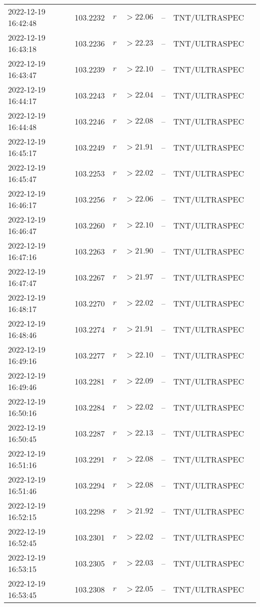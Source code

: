 \documentclass{nature_plusfigure}
\begin{document}
\begin{supplement}
\begin{center}
\begin{longtable}{lllllll}
2022-12-19 16:42:48 & 103.2232 & $r$ & $>22.06$ & -- & TNT/ULTRASPEC &  \\ 
2022-12-19 16:43:18 & 103.2236 & $r$ & $>22.23$ & -- & TNT/ULTRASPEC &  \\ 
2022-12-19 16:43:47 & 103.2239 & $r$ & $>22.10$ & -- & TNT/ULTRASPEC &  \\ 
2022-12-19 16:44:17 & 103.2243 & $r$ & $>22.04$ & -- & TNT/ULTRASPEC &  \\ 
2022-12-19 16:44:48 & 103.2246 & $r$ & $>22.08$ & -- & TNT/ULTRASPEC &  \\ 
2022-12-19 16:45:17 & 103.2249 & $r$ & $>21.91$ & -- & TNT/ULTRASPEC &  \\ 
2022-12-19 16:45:47 & 103.2253 & $r$ & $>22.02$ & -- & TNT/ULTRASPEC &  \\ 
2022-12-19 16:46:17 & 103.2256 & $r$ & $>22.06$ & -- & TNT/ULTRASPEC &  \\ 
2022-12-19 16:46:47 & 103.2260 & $r$ & $>22.10$ & -- & TNT/ULTRASPEC &  \\ 
2022-12-19 16:47:16 & 103.2263 & $r$ & $>21.90$ & -- & TNT/ULTRASPEC &  \\ 
2022-12-19 16:47:47 & 103.2267 & $r$ & $>21.97$ & -- & TNT/ULTRASPEC &  \\ 
2022-12-19 16:48:17 & 103.2270 & $r$ & $>22.02$ & -- & TNT/ULTRASPEC &  \\ 
2022-12-19 16:48:46 & 103.2274 & $r$ & $>21.91$ & -- & TNT/ULTRASPEC &  \\ 
2022-12-19 16:49:16 & 103.2277 & $r$ & $>22.10$ & -- & TNT/ULTRASPEC &  \\ 
2022-12-19 16:49:46 & 103.2281 & $r$ & $>22.09$ & -- & TNT/ULTRASPEC &  \\ 
2022-12-19 16:50:16 & 103.2284 & $r$ & $>22.02$ & -- & TNT/ULTRASPEC &  \\ 
2022-12-19 16:50:45 & 103.2287 & $r$ & $>22.13$ & -- & TNT/ULTRASPEC &  \\ 
2022-12-19 16:51:16 & 103.2291 & $r$ & $>22.08$ & -- & TNT/ULTRASPEC &  \\ 
2022-12-19 16:51:46 & 103.2294 & $r$ & $>22.08$ & -- & TNT/ULTRASPEC &  \\ 
2022-12-19 16:52:15 & 103.2298 & $r$ & $>21.92$ & -- & TNT/ULTRASPEC &  \\ 
2022-12-19 16:52:45 & 103.2301 & $r$ & $>22.02$ & -- & TNT/ULTRASPEC &  \\ 
2022-12-19 16:53:15 & 103.2305 & $r$ & $>22.03$ & -- & TNT/ULTRASPEC &  \\ 
2022-12-19 16:53:45 & 103.2308 & $r$ & $>22.05$ & -- & TNT/ULTRASPEC &  \\ 

\end{longtable}
\end{center}
\end{supplement}
\end{document}
